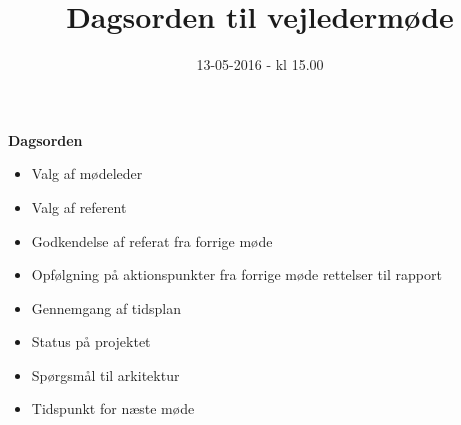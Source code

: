 \documentclass{article}
\title{Dagsorden til vejledermøde}
\date{13-05-2016 - kl 15.00}
\begin{document}
	\maketitle
	\textbf{Dagsorden}
	
	\begin{itemize}
		\item Valg af mødeleder
		\item Valg af referent
		\item Godkendelse af referat fra forrige møde 
		\item Opfølgning på aktionspunkter fra forrige møde
		\subitem rettelser til rapport
		\item Gennemgang af tidsplan
		\item Status på projektet
		\item Spørgsmål til arkitektur
		\item Tidspunkt for næste møde
	\end{itemize}
\end{document}
